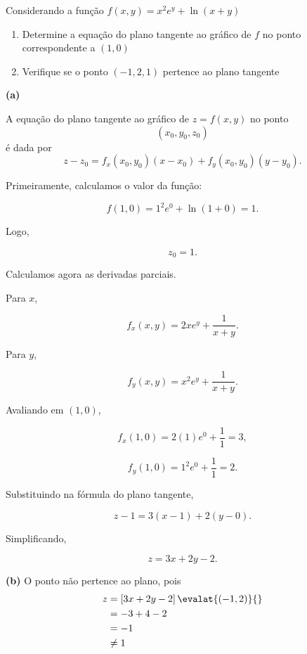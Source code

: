 \documentclass[a4paper,12pt,fleqn]{article}
\begin{document}
Considerando a função
\(
  f(x, y) = x^2 e^y + \ln(x+y)
\)
\begin{enumerate}[label=\alph*),nosep]
  \item Determine a equação do plano tangente ao gráfico de $f$
        no ponto correspondente a \((1, 0)\)
  \item Verifique se o ponto \((-1, 2, 1)\) pertence ao plano tangente
\end{enumerate}

\begin{answer}

  \textbf{(a)}

  A equação do plano tangente ao gráfico de \(z=f(x,y)\) no ponto
  \[
    (x_0,y_0,z_0)
  \]
  é dada por
  \[
    z-z_0
    = f_x(x_0,y_0)(x-x_0)
    + f_y(x_0,y_0)(y-y_0).
  \]
  
  Primeiramente, calculamos o valor da função:
  
  \[
  f(1,0)
  =
  1^2e^0+\ln(1+0)
  =
  1.
  \]
  
  Logo,
  
  \[
  z_0=1.
  \]
  
  Calculamos agora as derivadas parciais.
  
  Para \(x\),
  
  \[
  f_x(x,y)
  =
  2xe^y+\frac{1}{x+y}.
  \]
  
  Para \(y\),
  
  \[
  f_y(x,y)
  =
  x^2e^y+\frac{1}{x+y}.
  \]
  
  Avaliando em \((1,0)\),
  
  \[
  f_x(1,0)
  =
  2(1)e^0+\frac{1}{1}
  =
  3,
  \]
  
  \[
  f_y(1,0)
  =
  1^2e^0+\frac{1}{1}
  =
  2.
  \]
  
  Substituindo na fórmula do plano tangente,
  
  \[
  z-1
  =
  3(x-1)
  +
  2(y-0).
  \]
  
  Simplificando,
  
  \[
  z
  =
  3x+2y-2.
  \]
  
    \bigskip
    \textbf{(b)}
    O ponto não pertence ao plano, pois
    \begin{align*}
      z
      & = \left[3x+2y-2\right]\evalat{(-1, 2)}{} \\
      & = -3 +4 -2 \\
      & = -1 \\
      & \neq 1
    \end{align*}
  

\end{answer}
\end{document}
